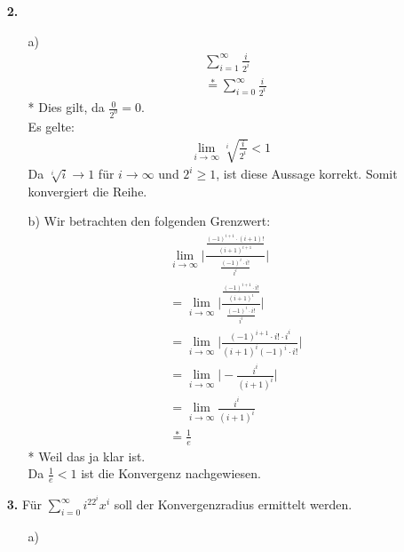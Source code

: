 \documentclass[a4paper,11pt]{article}
\begin{document}
\begin{enumerate}
        \item[\textbf{2.}]
            \begin{enumerate}
            \item[a)]
                \begin{align*}
                    &\sum_{i=1}^\infty \frac{i}{2^i}\\
                    &\overset{*}{=} \sum_{i=0}^\infty \frac{i}{2^i}
                \end{align*}
                * Dies gilt, da $\frac{0}{2^0} = 0$.\\
                Es gelte:
                \begin{align*}
                    \underset{i \to \infty}{\lim} \sqrt[i]{\frac{i}{2^i}} < 1
                \end{align*}
                Da $\sqrt[i]{i} \to 1$ für $i \to \infty$ und $2^i \geq 1$, ist diese Aussage korrekt. Somit konvergiert die Reihe.
            \item[b)]
                Wir betrachten den folgenden Grenzwert:
                \begin{align*}
                    &\underset{i \to \infty}{\lim} \Big| \frac{\frac{(-1)^{i+1}\cdot (i+1)!}{(i+1)^{i+1}}}{\frac{(-1)^i \cdot i!}{i^i}} \Big|\\
                    &= \underset{i \to \infty}{\lim} \Big| \frac{\frac{(-1)^{i+1}\cdot i!}{(i+1)^{i}}}{\frac{(-1)^i \cdot i!}{i^i}} \Big|\\
                    &= \underset{i \to \infty}{\lim} \Big| \frac{(-1)^{i+1}\cdot i! \cdot i^i}{(i+1)^i (-1)^i \cdot i!} \Big|\\
                    &= \underset{i \to \infty}{\lim} \Big| - \frac{i^i}{(i+1)^i} \Big|\\
                    &= \underset{i \to \infty}{\lim} \frac{i^i}{(i+1)^i}\\
                    &\overset{*}{=} \frac{1}{e}
                \end{align*}
                * Weil das ja klar ist.\\
                Da $\frac{1}{e} < 1$ ist die Konvergenz nachgewiesen.
            \end{enumerate}
        \item[\textbf{3.}]
            Für $\sum_{i=0}^\infty i^22^ix^i$ soll der Konvergenzradius ermittelt werden.
            \begin{enumerate}
            \item[a)]

\end{enumerate}
\end{enumerate}
\end{document}

